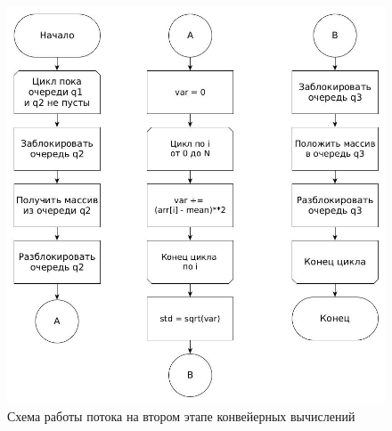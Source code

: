 \FloatBarrier
\begin{figure}[hp]
	\label{classic}
	\begin{center}
		\includegraphics[width=\linewidth]{graph/ex2.jpg}
	\end{center}
	\caption{Схема работы потока на втором этапе конвейерных вычислений}
\end{figure}
\FloatBarrier

